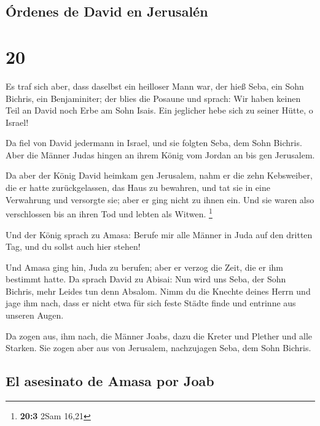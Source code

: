\hypertarget{uxf3rdenes-de-david-en-jerusaluxe9n}{%
\subsection{Órdenes de David en
Jerusalén}\label{uxf3rdenes-de-david-en-jerusaluxe9n}}

\hypertarget{section-19}{%
\section{20}\label{section-19}}

 Es traf sich aber, dass daselbst ein heilloser Mann war,
der hieß Seba, ein Sohn Bichris, ein Benjaminiter; der blies die Posaune
und sprach: Wir haben keinen Teil an David noch Erbe am Sohn Isais. Ein
jeglicher hebe sich zu seiner Hütte, o Israel!

 Da fiel von David jedermann in Israel, und sie folgten
Seba, dem Sohn Bichris. Aber die Männer Judas hingen an ihrem König vom
Jordan an bis gen Jerusalem.

 Da aber der König David heimkam gen Jerusalem, nahm er
die zehn Kebsweiber, die er hatte zurückgelassen, das Haus zu bewahren,
und tat sie in eine Verwahrung und versorgte sie; aber er ging nicht zu
ihnen ein. Und sie waren also verschlossen bis an ihren Tod und lebten
als Witwen. \footnote{\textbf{20:3} 2Sam 16,21}

 Und der König sprach zu Amasa: Berufe mir alle Männer in
Juda auf den dritten Tag, und du sollst auch hier stehen!

 Und Amasa ging hin, Juda zu berufen; aber er verzog die
Zeit, die er ihm bestimmt hatte.  Da sprach David zu
Abisai: Nun wird uns Seba, der Sohn Bichris, mehr Leides tun denn
Absalom. Nimm du die Knechte deines Herrn und jage ihm nach, dass er
nicht etwa für sich feste Städte finde und entrinne aus unseren Augen.

 Da zogen aus, ihm nach, die Männer Joabs, dazu die Kreter
und Plether und alle Starken. Sie zogen aber aus von Jerusalem,
nachzujagen Seba, dem Sohn Bichris.

\hypertarget{el-asesinato-de-amasa-por-joab}{%
\subsection{El asesinato de Amasa por
Joab}\label{el-asesinato-de-amasa-por-joab}}

